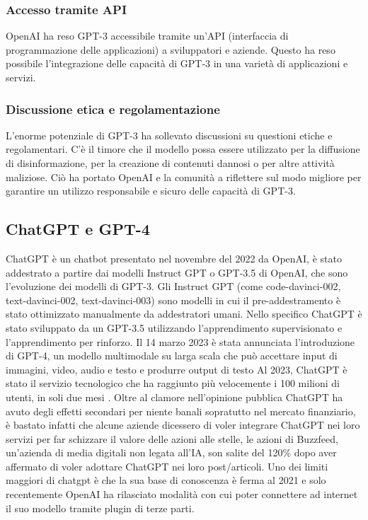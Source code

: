 \subsubsection{Accesso tramite API}
OpenAI ha reso GPT-3 accessibile tramite un'API (interfaccia di programmazione delle applicazioni) a sviluppatori e aziende. Questo ha reso possibile l'integrazione delle capacità di GPT-3 in una varietà di applicazioni e servizi.

\subsubsection{Discussione etica e regolamentazione}
L'enorme potenziale di GPT-3 ha sollevato discussioni su questioni etiche e regolamentari. C'è il timore che il modello possa essere utilizzato per la diffusione di disinformazione, per la creazione di contenuti dannosi o per altre attività maliziose. Ciò ha portato OpenAI e la comunità a riflettere sul modo migliore per garantire un utilizzo responsabile e sicuro delle capacità di GPT-3.

\subsection[ChatGPT e GPT4]{ChatGPT e GPT-4}

ChatGPT è un chatbot presentato nel novembre del 2022 da OpenAI, è stato addestrato a partire dai modelli Instruct GPT o GPT-3.5 di OpenAI, che sono l'evoluzione dei modelli di GPT-3. Gli Instruct GPT (come code-davinci-002, text-davinci-002, text-davinci-003) sono modelli in cui il pre-addestramento è stato ottimizzato manualmente da addestratori umani. Nello specifico ChatGPT è stato sviluppato da un GPT-3.5 utilizzando l'apprendimento supervisionato e l'apprendimento per rinforzo. Il 14 marzo 2023 è stata annunciata l'introduzione di GPT-4, un modello multimodale su larga scala che può accettare input di immagini, video, audio e testo e produrre output di testo
Al 2023, ChatGPT è stato il servizio tecnologico che ha raggiunto più velocemente i 100 milioni di utenti, in soli due mesi \cite{chat100}.
Oltre al clamore nell'opinione pubblica ChatGPT ha avuto degli effetti secondari per niente banali sopratutto nel mercato finanziario, è bastato infatti che alcune aziende dicessero di voler integrare ChatGPT nei loro servizi per far schizzare il valore delle azioni alle stelle, le azioni di Buzzfeed, un'azienda di media digitali non legata all'IA, son salite del 120\% \cite{buzz120} dopo aver affermato di voler adottare ChatGPT nei loro post/articoli.
Uno dei limiti maggiori di chatgpt è che la sua base di conoscenza è ferma al 2021 e solo recentemente OpenAI ha rilasciato modalità con cui poter connettere ad internet il suo modello tramite plugin di terze parti.

